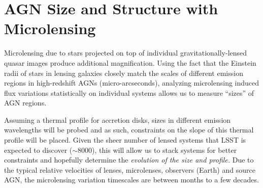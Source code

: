 %
%
%
%
%
%
%

\section{AGN Size and Structure with Microlensing}
\def\secname{AGNmicrolensing}\label{sec:\secname}




Microlensing due to stars projected on top of individual
gravitationally-lensed quasar images produce additional magnification.
Using the fact that the Einstein radii of stars in lensing galaxies
closely match the scales of different emission regions in
high-redshift AGNs (micro-arcseconds), analyzing microlensing induced
flux variations statistically on individual systems allows us to
measure ``sizes'' of AGN regions.

Assuming a thermal profile for accretion disks, sizes in different
emission wavelengths will be probed and as such, constraints on the
slope of this thermal profile will be placed. Given the sheer number
of lensed systems that LSST is expected to discover ($\sim8000$),
this will allow us to stack systems for better constraints and
hopefully determine the {\it evolution of the size and profile.} Due to the
typical relative velocities of lenses, microlenses, observers (Earth)
and source AGN, the microlensing variation timescales are between
months to a few decades.



